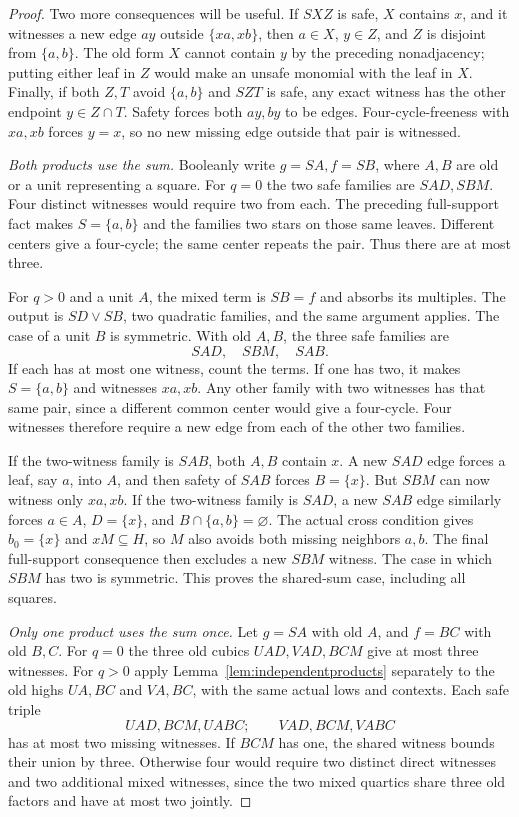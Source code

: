 \documentclass[11pt]{article}
\theoremstyle{definition}
\theoremstyle{remark}
\begin{document}
\begin{proof}
Two more consequences will be useful. If $SXZ$ is safe, $X$ contains $x$, and it witnesses a new edge $ay$ outside $\{xa,xb\}$, then $a\in X$, $y\in Z$, and $Z$ is disjoint from $\{a,b\}$. The old form $X$ cannot contain $y$ by the preceding nonadjacency; putting either leaf in $Z$ would make an unsafe monomial with the leaf in $X$. Finally, if both $Z,T$ avoid $\{a,b\}$ and $SZT$ is safe, any exact witness has the other endpoint $y\in Z\cap T$. Safety forces both $ay,by$ to be edges. Four-cycle-freeness with $xa,xb$ forces $y=x$, so no new missing edge outside that pair is witnessed.

\emph{Both products use the sum.} Booleanly write $g=SA,f=SB$, where $A,B$ are old or a unit representing a square. For $q=0$ the two safe families are $SAD,SBM$. Four distinct witnesses would require two from each. The preceding full-support fact makes $S=\{a,b\}$ and the families two stars on those same leaves. Different centers give a four-cycle; the same center repeats the pair. Thus there are at most three.

For $q>0$ and a unit $A$, the mixed term is $SB=f$ and absorbs its multiples. The output is $SD\vee SB$, two quadratic families, and the same argument applies. The case of a unit $B$ is symmetric. With old $A,B$, the three safe families are
\[
 SAD,\quad SBM,\quad SAB.
\]
If each has at most one witness, count the terms. If one has two, it makes $S=\{a,b\}$ and witnesses $xa,xb$. Any other family with two witnesses has that same pair, since a different common center would give a four-cycle. Four witnesses therefore require a new edge from each of the other two families.

If the two-witness family is $SAB$, both $A,B$ contain $x$. A new $SAD$ edge forces a leaf, say $a$, into $A$, and then safety of $SAB$ forces $B=\{x\}$. But $SBM$ can now witness only $xa,xb$. If the two-witness family is $SAD$, a new $SAB$ edge similarly forces $a\in A$, $D=\{x\}$, and $B\cap\{a,b\}=\varnothing$. The actual cross condition gives $b_0=\{x\}$ and $xM\subseteq H$, so $M$ also avoids both missing neighbors $a,b$. The final full-support consequence then excludes a new $SBM$ witness. The case in which $SBM$ has two is symmetric. This proves the shared-sum case, including all squares.

\emph{Only one product uses the sum once.} Let $g=SA$ with old $A$, and $f=BC$ with old $B,C$. For $q=0$ the three old cubics $UAD,VAD,BCM$ give at most three witnesses. For $q>0$ apply Lemma~\ref{lem:independentproducts} separately to the old highs $UA,BC$ and $VA,BC$, with the same actual lows and contexts. Each safe triple
\[
 UAD,BCM,UABC;\qquad VAD,BCM,VABC
\]
has at most two missing witnesses. If $BCM$ has one, the shared witness bounds their union by three. Otherwise four would require two distinct direct witnesses and two additional mixed witnesses, since the two mixed quartics share three old factors and have at most two jointly.


\end{proof}
\end{document}

